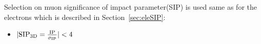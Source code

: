 Selection on muon significance of impact parameter(SIP) is used same as for the electrons which is described in Section~\ref{sec:eleSIP}:                                                                                                                                                               
%                                                                                                                                                                                                                                          
\begin{itemize}                                                                                                                                                                                                                            
\item $| {\rm SIP_{3D}} =    \frac{\rm IP}{\sigma_{\rm IP}} | < 4$                                                                                                                                                                         
\end{itemize}  
